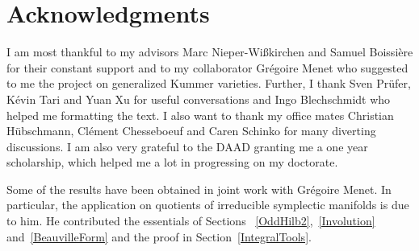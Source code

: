 \documentclass[11pt,twoside]{article}
\begin{document}




\section*{Acknowledgments}
I am most thankful to my advisors Marc Nieper-Wi\ss\-kir\-chen and Samuel Boissi\`ere for their constant support
and to my collaborator Gr\'egoire Menet who suggested to me the project on generalized Kummer varieties.
Further, I thank Sven Pr\"ufer, K\'evin Tari and Yuan Xu for useful conversations and
Ingo Blechschmidt who helped me formatting the text.
I also want to thank my office mates Christian H\"ubschmann, Cl\'ement Chesseboeuf and Caren Schinko for many diverting discussions.
I am also very grateful to the DAAD granting me a one year scholarship, which helped me a lot in progressing on my doctorate. 

Some of the results have been obtained in joint work with Gr\'egoire Menet. In particular, the application on quotients of irreducible symplectic manifolds is due to him.
He contributed the essentials of Sections~ \ref{OddHilb2},~\ref{Involution} and~\ref{BeauvilleForm} and the proof in Section~\ref{IntegralTools}.


\cleardoublepage

\tableofcontents

\cleardoublepage


\pagestyle{fancy}


\end{document}

